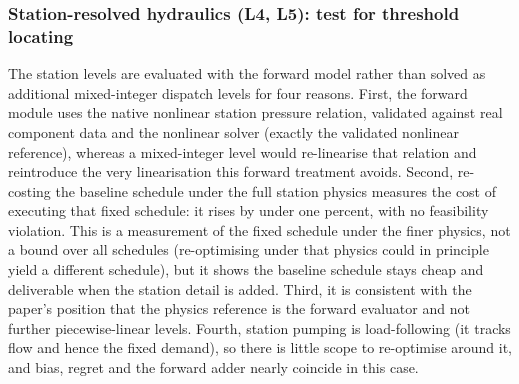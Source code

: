 \documentclass[a4paper,fleqn]{cas-sc}
\begin{document}
\subsubsection{Station-resolved hydraulics (L4, L5): test for threshold locating}\label{subsec:stationhyd}
The station levels are evaluated with the forward model rather than solved as additional
mixed-integer dispatch levels for four
reasons. First, the forward module uses the native nonlinear station pressure relation,
validated against real component data and the nonlinear solver (exactly the validated
nonlinear reference), whereas a mixed-integer level would re-linearise
that relation and reintroduce the very linearisation this forward treatment avoids. Second,
re-costing the baseline schedule under the full station physics measures the cost of executing
that fixed schedule: it rises by under one percent, with no feasibility violation. This is a
measurement of the fixed schedule under the finer physics, not a bound over all schedules
(re-optimising under that physics could in principle yield a different schedule), but it shows
the baseline schedule stays cheap and deliverable when the station detail is added. Third, it is consistent with the paper's position that the physics
reference is the forward evaluator and not further piecewise-linear levels. Fourth, station
pumping is load-following (it tracks flow and hence the fixed demand), so there is little scope
to re-optimise around it, and bias, regret and the forward adder nearly coincide in this case.
\end{document}
